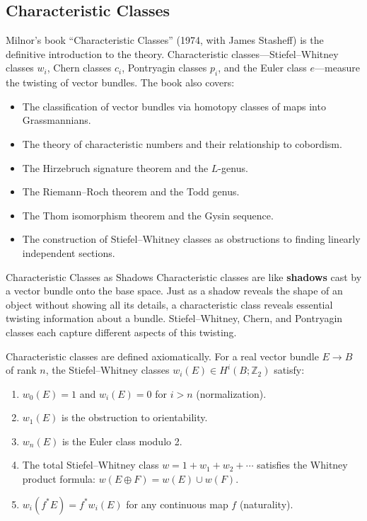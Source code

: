 \subsection{Characteristic Classes}

Milnor's book ``Characteristic Classes'' (1974, with James Stasheff) is the definitive introduction to the theory. Characteristic classes---Stiefel--Whitney classes $w_i$, Chern classes $c_i$, Pontryagin classes $p_i$, and the Euler class $e$---measure the twisting of vector bundles. The book also covers:
\begin{itemize}
\item The classification of vector bundles via homotopy classes of maps into Grassmannians.
\item The theory of characteristic numbers and their relationship to cobordism.
\item The Hirzebruch signature theorem and the $L$-genus.
\item The Riemann--Roch theorem and the Todd genus.
\item The Thom isomorphism theorem and the Gysin sequence.
\item The construction of Stiefel--Whitney classes as obstructions to finding linearly independent sections.
\end{itemize}

\begin{analogy}{Characteristic Classes as Shadows}
Characteristic classes are like \textbf{shadows} cast by a vector bundle onto the base space. Just as a shadow reveals the shape of an object without showing all its details, a characteristic class reveals essential twisting information about a bundle. Stiefel--Whitney, Chern, and Pontryagin classes each capture different aspects of this twisting.
\end{analogy}

Characteristic classes are defined axiomatically. For a real vector bundle $E \to B$ of rank $n$, the Stiefel--Whitney classes $w_i(E) \in H^i(B; \mathbb{Z}_2)$ satisfy:
\begin{enumerate}
\item $w_0(E) = 1$ and $w_i(E) = 0$ for $i > n$ (normalization).
\item $w_1(E)$ is the obstruction to orientability.
\item $w_n(E)$ is the Euler class modulo 2.
\item The total Stiefel--Whitney class $w = 1 + w_1 + w_2 + \cdots$ satisfies the Whitney product formula: $w(E \oplus F) = w(E) \cup w(F)$.
\item $w_i(f^*E) = f^*w_i(E)$ for any continuous map $f$ (naturality).
\end{enumerate}

